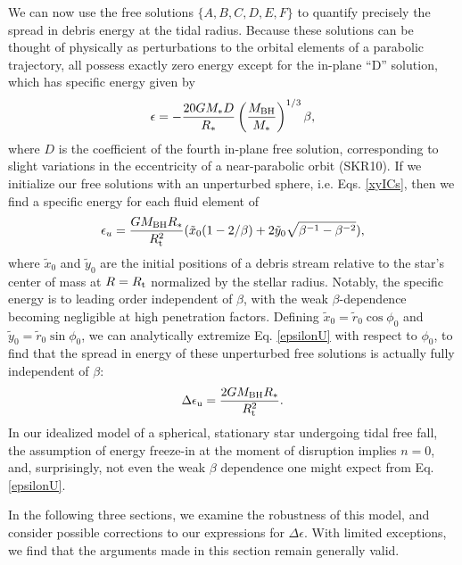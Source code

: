 \documentclass[useAMS, twocolumn, usenatbib]{mn2e}
\begin{document}
We can now use the free solutions $\{A, B, C, D, E, F\}$ to quantify precisely the spread in debris energy at the tidal radius.  Because these solutions can be thought of physically as perturbations to the orbital elements of a parabolic trajectory, all possess exactly zero energy except for the in-plane ``D'' solution, which has specific energy given by 
\begin{equation}
\epsilon=-\frac{20GM_*D}{R_*}\left( \frac{M_{\rm BH}}{M_*} \right)^{1/3} \beta,
\end{equation} 
where $D$ is the coefficient of the fourth in-plane free solution, corresponding to slight variations in the eccentricity of a near-parabolic orbit (SKR10).  If we initialize our free solutions with an unperturbed sphere, i.e. Eqs. \ref{xyICs}, then we find a specific energy for each fluid element of
\begin{equation}
\epsilon_u=\frac{GM_{\rm BH}R_*}{R_{\rm t}^2} (\tilde{x}_0(1-2/\beta)+2\tilde{y}_0\sqrt{\beta^{-1}-\beta^{-2}}) \label{epsilonU},
\end{equation}
where $\tilde{x}_0$ and $\tilde{y}_0$ are the initial positions of a debris stream relative to the star's center of mass at $R=R_{\rm t}$ normalized by the stellar radius.  Notably, the specific energy is to leading order independent of $\beta$, with the weak $\beta$-dependence becoming negligible at high penetration factors.    Defining $\tilde{x}_0=\tilde{r}_0 \cos \phi_0$ and $\tilde{y}_0=\tilde{r}_0 \sin \phi_0$, we can analytically extremize Eq. \ref{epsilonU} with respect to $\phi_0$, to find that the spread in energy of these unperturbed free solutions is actually fully independent of $\beta$: 
\begin{equation}
\Delta\epsilon_{\rm u}=\frac{2GM_{\rm BH}R_*}{R_{\rm t}^2} \label{DeltaEpsilonU}.
\end{equation}
In our idealized model of a spherical, stationary star undergoing tidal free fall, the assumption of energy freeze-in at the moment of disruption implies $n=0$, and, surprisingly, not even the weak $\beta$ dependence one might expect from Eq. \ref{epsilonU}.

In the following three sections, we examine the robustness of this model, and consider possible corrections to our expressions for $\Delta \epsilon$.  With limited exceptions, we find that the arguments made in this section remain generally valid.
\end{document}
